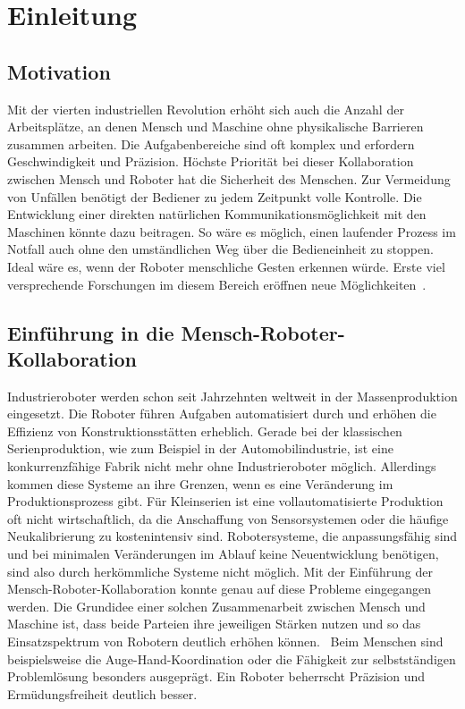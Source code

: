 \chapter{Einleitung}

\section{Motivation}
Mit der vierten industriellen Revolution erhöht sich auch die Anzahl der Arbeitsplätze, an denen Mensch und Maschine ohne physikalische Barrieren zusammen arbeiten. Die Aufgabenbereiche sind oft komplex und erfordern Geschwindigkeit und Präzision. Höchste Priorität bei dieser Kollaboration zwischen Mensch und Roboter hat die Sicherheit des Menschen. Zur Vermeidung von Unfällen benötigt der Bediener zu jedem Zeitpunkt volle Kontrolle. Die Entwicklung einer direkten natürlichen Kommunikationsmöglichkeit mit den Maschinen könnte dazu beitragen. So wäre es möglich, einen laufender Prozess im Notfall auch ohne den umständlichen Weg über die Bedieneinheit zu stoppen. Ideal wäre es, wenn der Roboter menschliche Gesten erkennen würde. Erste viel versprechende Forschungen im diesem Bereich eröffnen neue Möglichkeiten~\cite{flexibleSystem}.

\section{Einführung in die Mensch-Roboter-Kollaboration}
Industrieroboter werden schon seit Jahrzehnten weltweit in der Massenproduktion eingesetzt. Die Roboter führen Aufgaben automatisiert durch und erhöhen die Effizienz von Konstruktionsstätten erheblich. Gerade bei der klassischen Serienproduktion, wie zum Beispiel in der Automobilindustrie, ist eine konkurrenzfähige Fabrik nicht mehr ohne Industrieroboter möglich. Allerdings kommen diese Systeme an ihre Grenzen, wenn es eine Veränderung im Produktionsprozess gibt. Für Kleinserien ist eine vollautomatisierte Produktion oft nicht wirtschaftlich, da die Anschaffung von Sensorsystemen oder die häufige Neukalibrierung zu kostenintensiv sind. Robotersysteme, die anpassungsfähig sind und bei minimalen Veränderungen im Ablauf keine Neuentwicklung benötigen, sind also durch herkömmliche Systeme nicht möglich. Mit der Einführung der Mensch-Roboter-Kollaboration konnte genau auf diese Probleme eingegangen werden. Die Grundidee einer solchen Zusammenarbeit zwischen Mensch und Maschine ist, dass beide Parteien ihre jeweiligen Stärken nutzen und so das Einsatzspektrum von Robotern deutlich erhöhen können.~\cite{ObererTreitz.2019} Beim Menschen sind beispielsweise die Auge-Hand-Koordination oder die Fähigkeit zur selbstständigen Problemlösung besonders ausgeprägt. Ein Roboter beherrscht Präzision und Ermüdungsfreiheit deutlich besser.~\cite{fraunhoferMRK}

